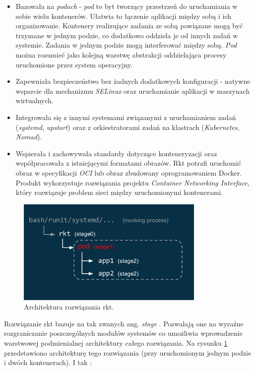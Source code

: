 \documentclass[10pt,a4paper,titlepage,twoside]{report}
\begin{document}
\begin{itemize}
\item Bazowała na \textit{podach} - \textit{pod} to byt tworzący przestrzeń do uruchamiania w sobie wielu kontenerów. Ułatwia to łączenie aplikacji między sobą i ich organizowanie. Kontenery realizujące zadania ze sobą powiązane mogą być trzymane w jednym podzie, co dodatkowo oddziela je od innych zadań w systemie. Zadania w jednym podzie mogą interferować między sobą. \textit{Pod} można rozumieć jako kolejną warstwę abstrakcji oddzielająca procesy uruchomione przez system operacyjny.
\item Zapewniała bezpieczeństwo bez żadnych dodatkowych konfiguracji - natywne wsparcie dla mechanizmu \textit{SELinux} oraz uruchamianie aplikacji w maszynach wirtualnych.
\item Integrowała się z innymi systemami związanymi z uruchamianiem zadań (\textit{systemd}, \textit{upstart}) oraz z orkiestratorami zadań na klastrach (\textit{Kubernetes}, \textit{Nomad}).
\item Wspierała i zachowywała standardy dotyczące konteneryzacji oraz współpracowała z istniejącymi formatami obrazów. Rkt potrafi uruchomić obraz w specyfikacji \textit{OCI} lub obraz zbudowany oprogramowaniem Docker. Produkt wykorzystuje rozwiązania projektu \textit{Container Networking Interface}, który rozwiązuje problem sieci między uruchomionymi kontenerami.
\end{itemize}

\begin{figure}[!h]
	\centering
	\includegraphics[scale=1]{pics/rkt-architecure.jpg}
	\caption{Architektura rozwiązania rkt.}
	\label{rkt_arch}
\end{figure}

Rozwiązanie rkt bazuje na tak zwanych ang. \textit{stage} \cite{ad30}. Pozwalają one na wyraźne rozgraniczanie poszczególnych modułów systemów co umożliwia wprowadzenie warstwowej podmienialnej architektury całego rozwiązania. Na rysunku \ref{rkt_arch} przedstawiono architekturę tego rozwiązania (przy uruchomionym jednym podzie i dwóch kontenerach). I tak \cite{ad30}:
\end{document}
